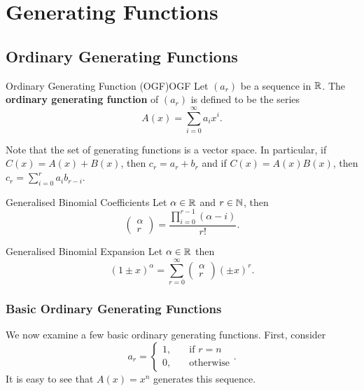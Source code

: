 \documentclass[math]{amznotes}
\theoremstyle{remark}
\begin{document}
\chapter{Generating Functions}
\section{Ordinary Generating Functions}
\begin{dfnbox}{Ordinary Generating Function (OGF)}{OGF}
    Let $(a_r)$ be a sequence in $\mathbb{R}$. The {\color{red} \textbf{ordinary generating function}} of $(a_r)$ is defined to be the series
    \begin{equation*}
        A(x) = \sum_{i = 0}^{\infty}a_ix^i.
    \end{equation*}
\end{dfnbox}
Note that the set of generating functions is a vector space. In particular, if $C(x) = A(x) + B(x)$, then $c_r = a_r + b_r$ and if $C(x) = A(x)B(x)$, then $c_r = \sum_{i = 0}^{r}a_ib_{r - i}$.
\begin{dfnbox}{Generalised Binomial Coefficients}{}
    Let $\alpha \in \mathbb{R}$ and $r \in \mathbb{N}$, then 
    \begin{equation*}
        \begin{pmatrix}
            \alpha \\
            r
        \end{pmatrix} = \frac{\prod_{i = 0}^{r - 1}(\alpha - i)}{r!}.
    \end{equation*}
\end{dfnbox}

\begin{dfnbox}{Generalised Binomial Expansion}{}
    Let $\alpha \in \mathbb{R}$ then 
    \begin{equation*}
        (1 \pm x)^\alpha = \sum_{r = 0}^{\infty}\begin{pmatrix}
            \alpha \\
            r
        \end{pmatrix}(\pm x)^r.
    \end{equation*}
\end{dfnbox}
\subsection{Basic Ordinary Generating Functions}
We now examine a few basic ordinary generating functions. First, consider
\begin{equation*}
    a_r = \begin{cases}
        1, & \quad\textrm{if } r = n \\
        0, & \quad\textrm{otherwise}
    \end{cases}.
\end{equation*}
It is easy to see that $A(x) = x^n$ generates this sequence.
\end{document}
